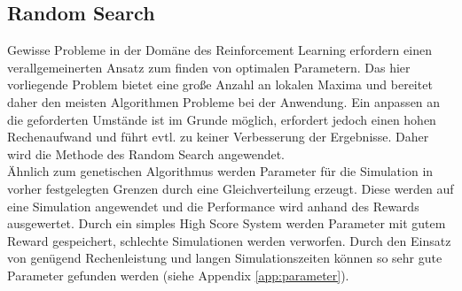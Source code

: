 	\subsection{Random Search}
		Gewisse Probleme in der Domäne des Reinforcement Learning erfordern einen verallgemeinerten Ansatz zum finden von optimalen Parametern. Das hier vorliegende Problem bietet eine große Anzahl an lokalen Maxima und bereitet daher den meisten Algorithmen Probleme bei der Anwendung. Ein anpassen an die geforderten Umstände ist im Grunde möglich, erfordert jedoch einen hohen Rechenaufwand und führt evtl. zu keiner Verbesserung der Ergebnisse. Daher wird die Methode des Random Search angewendet.\\
		Ähnlich zum genetischen Algorithmus werden Parameter für die Simulation in vorher festgelegten Grenzen durch eine Gleichverteilung erzeugt. Diese werden auf eine Simulation angewendet und die Performance wird anhand des Rewards ausgewertet. Durch ein simples High Score System werden Parameter mit gutem Reward gespeichert, schlechte Simulationen werden verworfen. Durch den Einsatz von genügend Rechenleistung und langen Simulationszeiten können so sehr gute Parameter gefunden werden (siehe Appendix \ref{app:parameter}).
	
